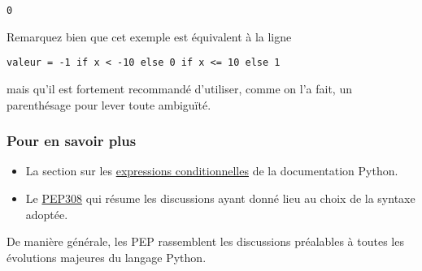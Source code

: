     \begin{Verbatim}[commandchars=\\\{\}]
0

    \end{Verbatim}

    Remarquez bien que cet exemple est équivalent à la ligne

\begin{verbatim}
valeur = -1 if x < -10 else 0 if x <= 10 else 1
\end{verbatim}

mais qu'il est fortement recommandé d'utiliser, comme on l'a fait, un
parenthésage pour lever toute ambiguïté.

    \hypertarget{pour-en-savoir-plus}{%
\subsubsection{Pour en savoir plus}\label{pour-en-savoir-plus}}

    \begin{itemize}
\tightlist
\item
  La section sur les
  \href{https://docs.python.org/3/reference/expressions.html\#conditional-expressions}{expressions
  conditionnelles} de la documentation Python.
\item
  Le \href{http://legacy.python.org/dev/peps/pep-0308/}{PEP308} qui
  résume les discussions ayant donné lieu au choix de la syntaxe
  adoptée.
\end{itemize}

De manière générale, les PEP rassemblent les discussions préalables à
toutes les évolutions majeures du langage Python.


    
    
    
